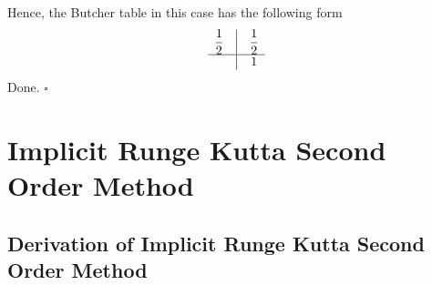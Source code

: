 \documentclass[a4paper,oneside]{book}
\numberwithin{equation}{chapter}
\begin{document}
Hence, the Butcher table in this case has the following form
\begin{align}
\begin{array}{*{20}{c}}
{\dfrac{1}{2}}&\vline& {\dfrac{1}{2}}\\
\hline
{}&\vline& 1
\end{array}
\end{align}
Done. \hfill $\square$








\chapter{Implicit Runge Kutta Second Order Method}
\section{Derivation of Implicit Runge Kutta Second Order Method}
\end{document}
